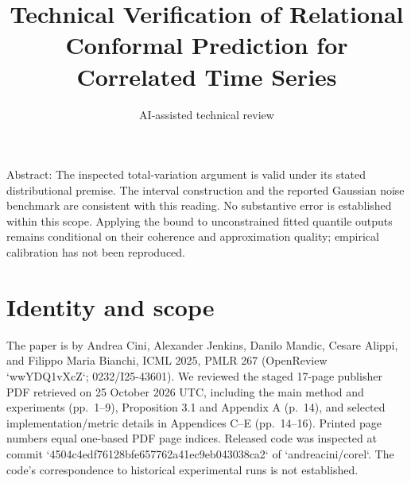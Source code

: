 \documentclass[10pt]{article}
\title{Technical Verification of
Relational Conformal Prediction for Correlated Time Series}
\author{AI-assisted technical review}
\date{}
\begin{document}
\maketitle
Abstract: The inspected total-variation argument is valid under its stated distributional premise. The interval construction and the reported Gaussian noise benchmark are consistent with this reading. No substantive error is established within this scope. Applying the bound to unconstrained fitted quantile outputs remains conditional on their coherence and approximation quality; empirical calibration has not been reproduced.\par
\section*{Identity and scope}
The paper is by Andrea Cini, Alexander Jenkins, Danilo Mandic, Cesare Alippi, and Filippo Maria Bianchi, ICML 2025, PMLR 267 (OpenReview `wwYDQ1vXcZ`; 0232/I25-43601). We reviewed the staged 17-page publisher PDF retrieved on 25 October 2026 UTC, including the main method and experiments (pp. 1–9), Proposition 3.1 and Appendix A (p. 14), and selected implementation/metric details in Appendices C–E (pp. 14–16). Printed page numbers equal one-based PDF page indices. Released code was inspected at commit `4504c4edf76128bfe657762a41ec9eb043038ca2` of `andreacini/corel`. The code’s correspondence to historical experimental runs is not established.\par
\end{document}
